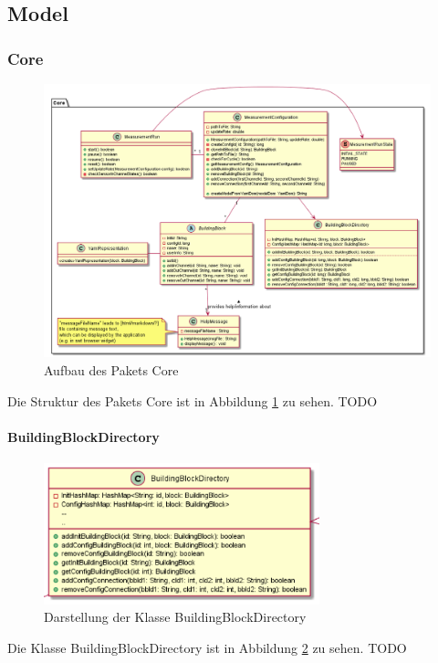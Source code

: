 \documentclass[parskip=full]{scrartcl}
\begin{document}
\clearpage
\subsection{Model}


\subsubsection{Core}

\begin{figure}[htbp]
	\begin{center}
		\includegraphics[width = 16cm]{Grafiken/ModelCore.png}
		\caption{Aufbau des Pakets Core}
		\label{ModelCore}
	\end{center}
\end{figure}

Die Struktur des Pakets Core ist in Abbildung \ref{ModelCore} zu sehen.
TODO



\paragraph{BuildingBlockDirectory}

\begin{figure}[htbp]
	\begin{center}
		\includegraphics[width = 8cm]{Grafiken/BuildingBlockDirectory.png}
		\caption{Darstellung der Klasse BuildingBlockDirectory}
		\label{BuildingBlockDirectory}
	\end{center}
\end{figure}
Die Klasse BuildingBlockDirectory ist in Abbildung \ref{BuildingBlockDirectory} zu sehen.
TODO
\end{document}
